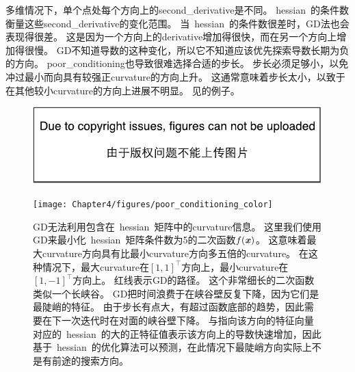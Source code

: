 多维情况下，单个点处每个方向上的\gls{second_derivative}是不同。
\gls{hessian}~的条件数衡量这些\gls{second_derivative}的变化范围。
当~\gls{hessian}~的条件数很差时，\gls{GD}法也会表现得很差。
这是因为一个方向上的\gls{derivative}增加得很快，而在另一个方向上增加得很慢。
\gls{GD}不知道导数的这种变化，所以它不知道应该优先探索导数长期为负的方向。
\gls{poor_conditioning}也导致很难选择合适的步长。
步长必须足够小，以免冲过最小而向具有较强正\gls{curvature}的方向上升。
这通常意味着步长太小，以致于在其他较小\gls{curvature}的方向上进展不明显。
见的例子。
\begin{figure}[!htb]
\ifOpenSource
\centerline{\includegraphics{figure.pdf}}
\else
\centerline{\texttt{[image: Chapter4/figures/poor\_conditioning\_color]}}
\fi
\caption{\gls{GD}无法利用包含在~\gls{hessian}~矩阵中的\gls{curvature}信息。
这里我们使用\gls{GD}来最小化~\gls{hessian}~矩阵条件数为5的二次函数$f(\boldsymbol{\mathit{x}})$。
这意味着最大\gls{curvature}方向具有比最小\gls{curvature}方向多五倍的\gls{curvature}。
在这种情况下，最大\gls{curvature}在$[1,1]^\top$方向上，最小\gls{curvature}在$[1,-1]^\top$方向上。
红线表示\gls{GD}的路径。
这个非常细长的二次函数类似一个长峡谷。
\gls{GD}把时间浪费于在峡谷壁反复下降，因为它们是最陡峭的特征。
由于步长有点大，有超过函数底部的趋势，因此需要在下一次迭代时在对面的峡谷壁下降。
与指向该方向的特征向量对应的~\gls{hessian}~的大的正特征值表示该方向上的导数快速增加，因此基于~\gls{hessian}~的优化算法可以预测，在此情况下最陡峭方向实际上不是有前途的搜索方向。
}
\label{fig:chap4_poor_conditioning_color}
\end{figure}


